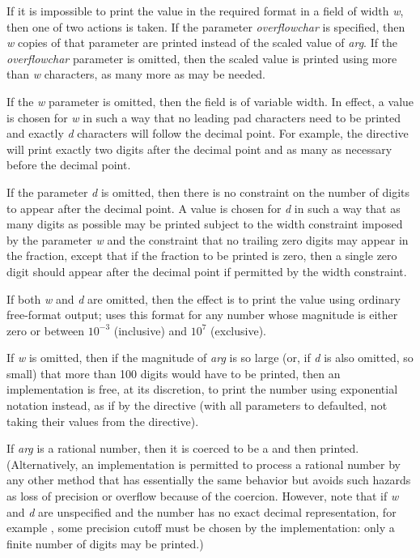 \begin{flushdesc}
If it is impossible to print the value in the required format in a field
of width \emph{w}, then one of two actions is taken.  If the
parameter \emph{overflowchar} is specified, then \emph{w} copies of that
parameter are printed instead of the scaled value of \emph{arg}.
If the \emph{overflowchar} parameter is omitted, then the scaled value
is printed using more than \emph{w} characters, as many more as may be
needed.

If the \emph{w} parameter is omitted, then the field is of variable width.
In effect, a value is chosen
for \emph{w} in such a way that no leading pad characters need to be printed
and exactly \emph{d} characters will follow the decimal point.
For example, the directive  will print exactly
two digits after the decimal point and as many as necessary before the
decimal point.

If the parameter \emph{d} is omitted, then there is no constraint
on the number of digits to appear after the decimal point.
A value is chosen for \emph{d} in such a way that as many digits
as possible may be printed subject to the width constraint
imposed by the parameter \emph{w} and the constraint that no trailing
zero digits may appear in the fraction, except that if the
fraction to be printed is zero, then a single zero digit should
appear after the decimal point if permitted by the width constraint.

If both \emph{w} and \emph{d} are omitted, then the effect is to print
the value using ordinary free-format output;  uses this format
for any number whose magnitude is either zero or between
$10^{-3}$ (inclusive) and $10^7$ (exclusive).

If \emph{w} is omitted, then if the magnitude of \emph{arg} is so large (or, if
\emph{d} is also omitted, so small) that more than 100 digits would have to
be printed, then an implementation is free, at its discretion, to print
the number using exponential notation instead, as if by the directive
 (with all parameters to  defaulted, not
taking their values from the  directive).

If \emph{arg} is a rational number, then it is coerced to be a 
and then printed.  (Alternatively, an implementation is permitted to
process a rational number by any other method that has essentially the
same behavior but avoids such hazards as loss of precision or overflow
because of the coercion.  However, note that if \emph{w} and \emph{d} are
unspecified and the number has no exact decimal representation,
for example , some precision cutoff must be chosen
by the implementation: only a finite number of digits may be printed.)


\end{flushdesc}
